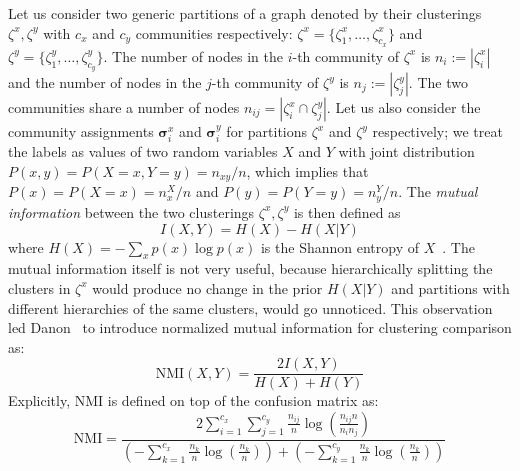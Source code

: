 Let us consider two generic partitions of a graph denoted by their clusterings $\zeta^x,\zeta^y$ with $c_x$ and $c_y$ communities respectively: $\zeta^x=\{\zeta^x_1,\ldots,\zeta^x_{c_x}\}$ and $\zeta^y=\{\zeta^y_1,\ldots,\zeta^y_{c_y}\}$.
The number of nodes in the $i$-th community of $\zeta^x$ is $n_i :=|\zeta^x_i|$ and the number of nodes in the $j$-th community of $\zeta^y$ is $n_j:=|\zeta^y_j|$. The two communities share a number of nodes $n_{ij}=| \zeta^x_i \cap \zeta^y_j|$.
Let us also consider the community assignments $\boldsymbol\sigma^x_i$ and $\boldsymbol\sigma^y_i$ for partitions $\zeta^x$ and $\zeta^y$ respectively; we treat the labels as values of two random variables $X$ and $Y$ with joint distribution $P(x,y)=P(X=x, Y=y) = n_{xy}/n$, which implies that $P(x)=P(X=x)=n_x^X/n$ and $P(y)=P(Y=y)=n_y^Y/n$.
The \emph{mutual information} between the two clusterings $\zeta^x,\zeta^y$ is then defined as 
\begin{equation}I(X,Y)=H(X) - H(X|Y)
\end{equation}
where $H(X)=-\sum_x p(x) \log p(x)$ is the Shannon entropy of $X$~\cite{cover2006}.
The mutual information itself is not very useful, because hierarchically splitting the clusters in $\zeta^x$ would produce no change in the prior $H(X|Y)$ and partitions with different hierarchies of the same clusters, would go unnoticed.
This observation led Danon~\cite{danon2005} to introduce normalized mutual information for clustering comparison as: 
\begin{equation}\label{eq:nmi}
\textrm{NMI}(X,Y) = \frac{2I(X,Y)}{H(X)+H(Y)}
\end{equation}
Explicitly, NMI is defined on top of the confusion matrix as:
\begin{equation}\label{eq:nmiexplicit}
\textrm{NMI} = \dfrac{2\sum \limits_{i=1}^{c_x} \sum \limits_{j=1}^{c_y} \frac{n_{ij}}{n} \log\left( \frac{n_{ij}n}{n_i n_j} \right)} {\left(-\sum \limits_{k=1}^{c_x} \frac{n_k}{n}\log\left(\frac{n_k}{n}\right) \right) + \left(-\sum \limits_{k=1}^{c_y} \frac{n_k}{n}\log\left(\frac{n_k}{n}\right) \right)}
\end{equation}

